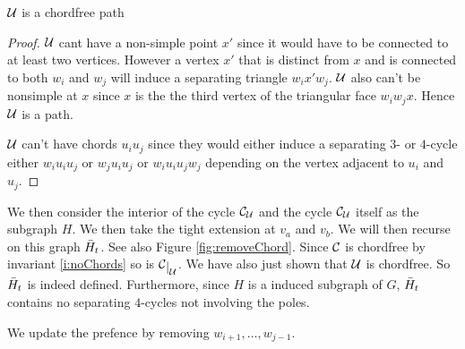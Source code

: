   \begin{lemma}
  $\mathcal{U}$ is a chordfree path
  \end{lemma}
  \begin{proof}

  $\mathcal{U}$ cant have a non-simple point $x'$ since it would have to be connected to at least two vertices. However a vertex $x'$ that is distinct from $x$ and is connected to both $w_i$ and $w_j$ will induce a separating triangle $w_i x' w_j$. $\mathcal{U}$ also can't be nonsimple at $x$ since $x$ is the the third vertex of the triangular face $w_i w_j x$. Hence $\mathcal{U}$ is a path.


  $\mathcal{U}$ can't have chords $u_i u_j$ since they would either induce a separating $3$- or $4$-cycle either $w_i u_i u_j$ or $w_j u_i u_j$ or $w_i u_i u_j w_j$ depending on the vertex adjacent to $u_i$ and $u_j$.
  \end{proof}


  We then consider the interior of the cycle $\mathcal{C}_{\mathcal{U}}$ and the cycle $\mathcal{C}_{\mathcal{U}}$ itself as the subgraph $H$. We then take the tight extension at $v_a$ and $v_b$. We will then recurse on this graph $\bar{H}_t$. See also Figure \ref{fig:removeChord}. Since $\mathcal{C}$ is chordfree by invariant \ref{i:noChords} so is $\restC{\U}$. We have also just shown that $\mathcal{U}$ is chordfree. So $\bar{H}_t$ is indeed defined. Furthermore, since $H$ is a induced subgraph of $G$, $\bar{H}_t$ contains no separating $4$-cycles not involving the poles.

  We update the prefence by removing $w_{i+1}, \ldots, w_{j-1}$.

